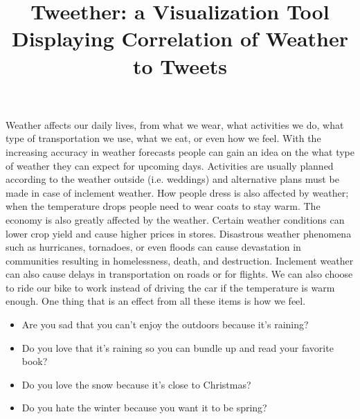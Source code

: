 \documentclass[journal]{vgtc}                %
\title{Tweether: a Visualization Tool Displaying Correlation of Weather to Tweets}
\author{}
\begin{document}

\maketitle

Weather affects our daily lives, from what we wear, what activities we do, what type of transportation we use, what we eat, or even how we feel.  With the increasing accuracy in weather forecasts people can gain an idea on the what type of weather they can expect for upcoming days. Activities are usually planned according to the weather outside (i.e. weddings) and alternative plans must be made in case of inclement weather. How people dress is also affected by weather; when the temperature drops people need to wear coats to stay warm. The economy is also greatly affected by the weather. Certain weather conditions can lower crop yield and cause higher prices in stores. Disastrous weather phenomena such as hurricanes, tornadoes, or even floods can cause devastation in communities resulting in homelessness, death, and destruction. Inclement weather can also cause delays in transportation on roads or for flights. We can also choose to ride our bike to work instead of driving the car if the temperature is warm enough. One thing that is an effect from all these items is how we feel.

\begin{itemize}
\item Are you sad that you can't enjoy the outdoors because it's raining?
\item Do you love that it's raining so you can bundle up and read your favorite book?
\item Do you love the snow because it's close to Christmas?
\item Do you hate the winter because you want it to be spring?
\end{itemize}
\end{document}
